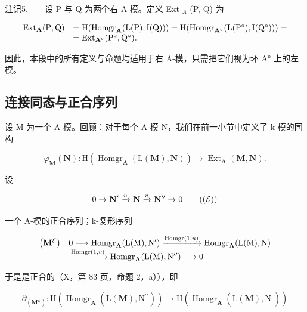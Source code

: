 注记5.——设 P 与 Q 为两个右 A-模。定义 Ext \(_{A}\) (P, Q) 为

\[
\begin{array}{r l} \operatorname{Ext} _ {\mathbf {A}} (\mathrm{P}, \mathrm{Q}) & = \mathrm{H} (\operatorname{Homgr} _ {\mathbf {A}} (\mathrm{L} (\mathrm{P}), \mathrm{I} (\mathrm{Q}))) = \mathrm{H} (\operatorname{Homgr} _ {\mathbf {A} ^ {\circ}} (\mathrm{L} (\mathrm{P} ^ {\circ}), \mathrm{I} (\mathrm{Q} ^ {\circ}))) = \\ & = \operatorname{Ext} _ {\mathbf {A} ^ {\circ}} (\mathrm{P} ^ {\circ}, \mathrm{Q} ^ {\circ}). \end{array}
\]

因此，本段中的所有定义与命题均适用于右 A-模，只需把它们视为环 A° 上的左模。

\subsection{连接同态与正合序列}

设 M 为一个 A-模。回顾：对于每个 A-模 N，我们在前一小节中定义了 k-模的同构

\[
\varphi_ {\mathbf {M}} (\mathbf {N}): \mathrm{H} (\operatorname{Homgr} _ {\mathbf {A}} (\mathrm{L} (\mathbf {M}), \mathbf {N})) \rightarrow \operatorname{Ext} _ {\mathbf {A}} (\mathbf {M}, \mathbf {N}).
\]

设

\[
0 \to \mathbf {N} ^ {\prime} \xrightarrow {u} \mathbf {N} \xrightarrow {v} \mathbf {N} ^ {\prime \prime} \to 0\tag{$(\mathcal{E})$}
\]

一个 A-模的正合序列；k-复形序列

\[
\begin{array}{r l} \left(\mathbf {M} ^ {\mathcal {E}}\right) & 0 \longrightarrow \operatorname{Homgr} _ {\mathbf {A}} (\mathrm{L} (\mathrm{M}), \mathrm{N} ^ {\prime}) \xrightarrow {\operatorname{Homgr} (1 , u)} \operatorname{Homgr} _ {\mathbf {A}} (\mathrm{L} (\mathrm{M}), \mathrm{N}) \\ & \xrightarrow {\operatorname{Homgr} (1 , v)} \operatorname{Homgr} _ {\mathbf {A}} (\mathrm{L} (\mathrm{M}), \mathrm{N} ^ {\prime \prime}) \longrightarrow 0 \end{array}
\]

于是是正合的（X，第 83 页，命题 2，a）），即

\[
\partial_ {(\mathbf {M} ^ {\mathcal {E}})}: \mathrm{H} (\operatorname{Homgr} _ {\mathbf {A}} (\mathrm{L} (\mathbf {M}), \mathrm{N} ^ {\prime \prime})) \rightarrow \mathrm{H} (\operatorname{Homgr} _ {\mathbf {A}} (\mathrm{L} (\mathbf {M}), \mathrm{N} ^ {\prime}))
\]

